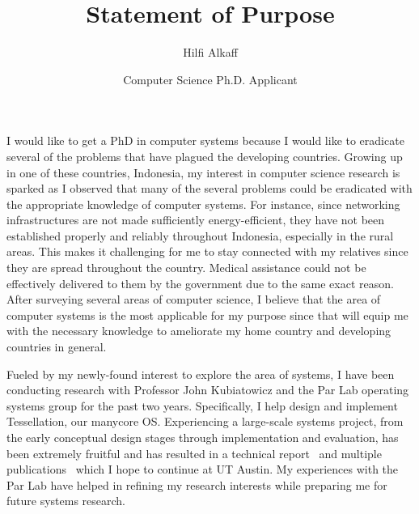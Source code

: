 \documentclass[12pt]{article}
\title{Statement of Purpose}
\author{Hilfi Alkaff}
\date{Computer Science Ph.D. Applicant}
\begin{document}
  \maketitle%

I would like to get a PhD in computer systems because I would like to eradicate several of the problems that have plagued the developing countries. Growing up in one of these countries, Indonesia, my interest in computer science research is sparked as I observed that many of the several problems could be eradicated with the appropriate knowledge of computer systems. For instance, since networking infrastructures are not made sufficiently energy-efficient, they have not been established properly and reliably throughout Indonesia, especially in the rural areas. This makes it challenging for me to stay connected with my relatives since they are spread throughout the country. Medical assistance could not be effectively delivered to them by the government due to the same exact reason. After surveying several areas of computer science, I believe that the area of computer systems is the most applicable for my purpose since that will equip me with the necessary knowledge to ameliorate my home country and developing countries in general. \newline


Fueled by my newly-found interest to explore the area of systems, I have been conducting research with Professor John Kubiatowicz and the Par Lab operating systems group for the past two years. Specifically, I help design and implement Tessellation, our manycore OS. Experiencing a large-scale systems project, from the early conceptual design stages through implementation and evaluation, has been extremely fruitful and has resulted in a technical report~\cite{tess_retreat2010} and multiple publications~\cite{tess_hotchip, tess_eurosys, tess_cata} which I hope to continue at UT Austin. My experiences with the Par Lab have helped in refining my research interests while preparing me for future systems research. \newline
\end{document}
